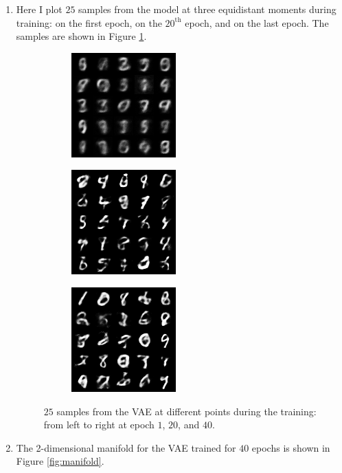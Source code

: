 \documentclass{article}
\begin{document}
\begin{enumerate}[label=\textbf{1.\arabic*}]
  \item
  Here I plot $25$ samples from the model at three equidistant moments during training: on the first epoch, on the $20^{\text{th}}$ epoch, and on the last epoch. The samples are shown in Figure \ref{fig:samples}.

  \begin{figure}
  \centering
  \begin{subfigure}
    \centering
    \includegraphics[width=.3\linewidth]{img/samples_epoch_00.png}
  \end{subfigure}
  \begin{subfigure}
    \centering
    \includegraphics[width=.3\linewidth]{img/samples_epoch_19.png}
  \end{subfigure}
  \begin{subfigure}
    \centering
    \includegraphics[width=.3\linewidth]{img/samples_epoch_39.png}
  \end{subfigure}
  \caption{$25$ samples from the VAE at different points during the training: from left to right at epoch $1$, $20$, and $40$.}
  \label{fig:samples}
  \end{figure}

  \item
  The 2-dimensional manifold for the VAE trained for $40$ epochs is shown in Figure \ref{fig:manifold}.


\end{enumerate}
\end{document}
